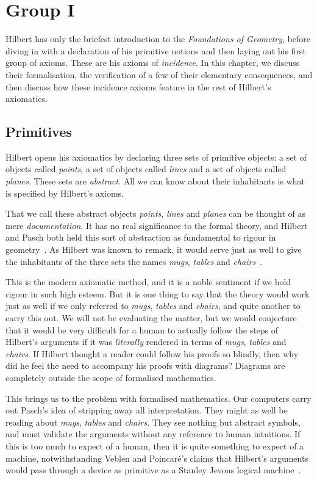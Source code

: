 \chapter{Group I}\label{chapter:Group1}

Hilbert has only the briefest introduction to the \emph{Foundations of Geometry}, before diving in with a declaration of his primitive notions and then laying out his first group of axioms. These are his axioms of \emph{incidence}. In this chapter, we discuss their formalisation, the verification of a few of their elementary consequences, and then discuss how these incidence axioms feature in the rest of Hilbert's axiomatics.

\section{Primitives}
Hilbert opens his axiomatics by declaring three sets of primitive objects: a set of objects called \emph{points}, a set of objects called \emph{lines} and a set of objects called \emph{planes}. These sets are \emph{abstract}. All we can know about their inhabitants is what is specified by Hilbert's axioms. 

That we call these abstract objects \emph{points}, \emph{lines} and \emph{planes} can be thought of as mere \emph{documentation}. It has no real significance to the formal theory, and Hilbert and Pasch both held this sort of abstraction as fundamental to rigour in geometry~\cite{TableChairMug}. As Hilbert was known to remark, it would serve just as well to give the inhabitants of the three sets the names \emph{mugs}, \emph{tables} and \emph{chairs}~\cite{PaschToPeano}. 

This is the modern axiomatic method, and it is a noble sentiment if we hold rigour in such high esteem. But it is one thing to say that the theory would work just as well if we only referred to \emph{mugs}, \emph{tables} and \emph{chairs}, and quite another to carry this out. We will not be evaluating the matter, but we would conjecture that it would be very difficult for a human to actually follow the steps of Hilbert's arguments if it was \emph{literally} rendered in terms of \emph{mugs}, \emph{tables} and \emph{chairs}. If Hilbert thought a reader could follow his proofs so blindly, then why did he feel the need to accompany his proofs with diagrams? Diagrams are completely outside the scope of formalised mathematics.

This brings us to the problem with formalised mathematics. Our computers carry out Pasch's idea of stripping away all interpretation. They might as well be reading about \emph{mugs}, \emph{tables} and \emph{chairs}. They see nothing but abstract symbols, and must validate the arguments without any reference to human intuitions. If this is too much to expect of a human, then it is quite something to expect of a machine, notwithstanding Veblen and Poincar\'{e}'s claims that Hilbert's arguments would pass through a device as primitive as a Stanley Jevons logical machine~\cite{PoincareReview,VeblenHilbertReview}.

